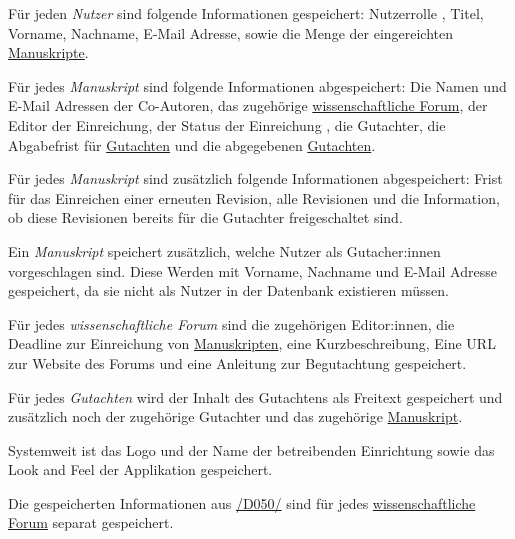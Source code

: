 
\begin{description}
	 Für jeden \emph{Nutzer} sind folgende Informationen gespeichert: Nutzerrolle , Titel, Vorname, Nachname, E-Mail Adresse, sowie die Menge der eingereichten \hyperref[d020]{Manuskripte}.
	
	 Für jedes \emph{Manuskript} sind folgende Informationen abgespeichert: Die Namen und E-Mail Adressen der Co-Autoren, das zugehörige \hyperref[d030]{wissenschaftliche Forum}, der Editor  der Einreichung, der Status der Einreichung , die Gutachter, die Abgabefrist für \hyperref[d040]{Gutachten} und die abgegebenen \hyperref[d040]{Gutachten}.
	
	 Für jedes \emph{Manuskript} sind zusätzlich folgende Informationen abgespeichert: Frist für das Einreichen einer erneuten Revision, alle Revisionen  und die Information, ob diese Revisionen bereits für die Gutachter freigeschaltet sind.
	
	 Ein \emph{Manuskript} speichert zusätzlich, welche Nutzer als Gutacher:innen vorgeschlagen sind. Diese Werden mit Vorname, Nachname und E-Mail Adresse gespeichert, da sie nicht als Nutzer in der Datenbank existieren müssen.
	
	 Für jedes \emph{wissenschaftliche Forum} sind die zugehörigen Editor:innen, die Deadline zur Einreichung von \hyperref[d020]{Manuskripten}, eine Kurzbeschreibung, Eine URL zur Website des Forums und eine Anleitung zur Begutachtung gespeichert.
	
	 Für jedes \emph{Gutachten} wird der Inhalt des Gutachtens als Freitext gespeichert und zusätzlich noch der zugehörige Gutachter  und das zugehörige \hyperref[d020]{Manuskript}.
	
	 Systemweit ist das Logo und der Name der betreibenden Einrichtung sowie das Look and Feel der Applikation gespeichert.
	
	 Die gespeicherten Informationen aus \hyperref[d050]{/D050/} sind für jedes \hyperref[d030]{wissenschaftliche Forum} separat gespeichert.
\end{description}